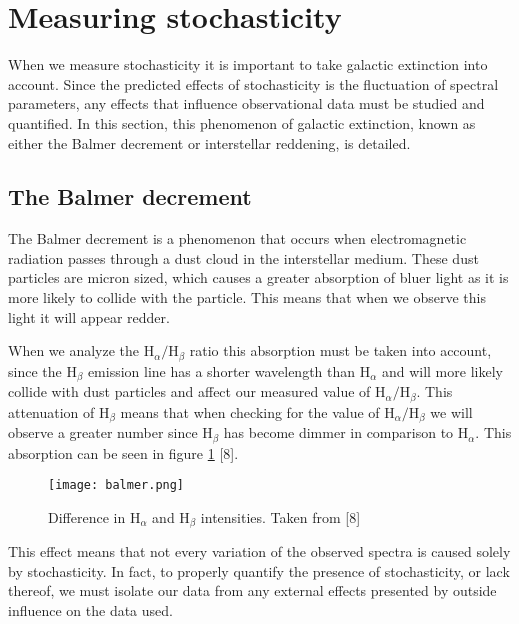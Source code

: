 \section{Measuring stochasticity}

When we measure stochasticity it is important to take galactic extinction into account. Since the predicted effects of stochasticity
is the fluctuation of spectral parameters, any effects that influence observational data must be studied and quantified. In this
section, this phenomenon of galactic extinction, known as either the Balmer decrement or interstellar reddening, is detailed.

\subsection{The Balmer decrement}

The Balmer decrement is a phenomenon that occurs when electromagnetic radiation passes through
a dust cloud in the interstellar medium. These dust particles are micron sized, which causes a greater absorption of bluer light
as it is more likely to collide with the particle. This means that when we observe this light it will appear redder.

When we analyze the H$_{\alpha}/$H$_{\beta}$ ratio this absorption must be taken into account, since the H$_{\beta}$ emission line
has a shorter wavelength than H$_{\alpha}$ and will more likely collide with dust particles and affect our measured value of
H$_{\alpha}/$H$_{\beta}$. This attenuation of H$_{\beta}$ means that when checking for the value of H$_{\alpha}/$H$_{\beta}$ we will
observe a greater number since H$_{\beta}$ has become dimmer in comparison to H$_{\alpha}$. This absorption can be seen in figure
\ref{fig2-3} [8].
\begin{figure}
  \centering
  \texttt{[image: balmer.png]}
  \caption{Difference in H$_{\alpha}$ and H$_{\beta}$ intensities. Taken from [8]}
  \label{fig2-3}
\end{figure}

This effect means that not every variation of the observed spectra is caused solely by stochasticity. In fact, to properly quantify
the presence of stochasticity, or lack thereof, we must isolate our data from any external effects presented by outside influence
on the data used.
